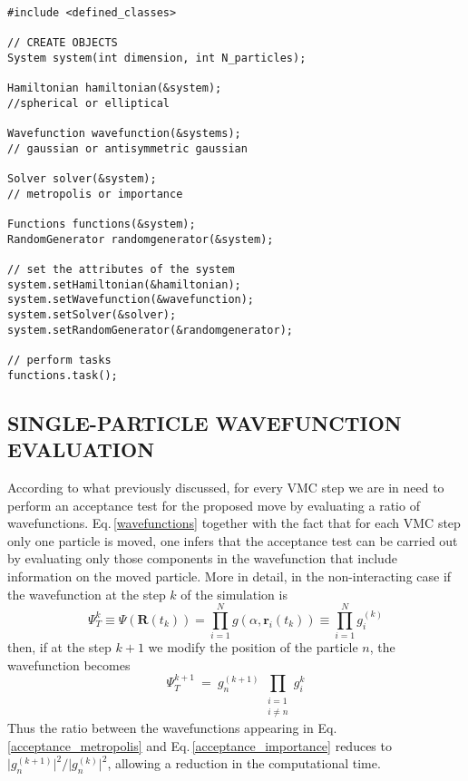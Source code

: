 \begin{verbatim}
#include <defined_classes>

// CREATE OBJECTS
System system(int dimension, int N_particles);

Hamiltonian hamiltonian(&system);
//spherical or elliptical

Wavefunction wavefunction(&systems);
// gaussian or antisymmetric gaussian

Solver solver(&system);
// metropolis or importance

Functions functions(&system);
RandomGenerator randomgenerator(&system);

// set the attributes of the system
system.setHamiltonian(&hamiltonian);
system.setWavefunction(&wavefunction);
system.setSolver(&solver);
system.setRandomGenerator(&randomgenerator);

// perform tasks
functions.task();
\end{verbatim}



\subsection{SINGLE-PARTICLE WAVEFUNCTION EVALUATION}
According to what previously discussed, for every VMC step we are in need to perform an acceptance test for the proposed move by evaluating a ratio of wavefunctions. Eq.\,\ref{wavefunctions} together with the fact that for each VMC step only one particle is moved, one infers that the acceptance test can be carried out by evaluating only those components in the wavefunction that include information on the moved particle. More in detail, in the non-interacting case if the wavefunction at the step $k$ of the simulation is
\begin{equation*}
    \Psi_T^{k} \equiv \Psi(\bm{R}(t_k)) = \prod_{i=1}^{N} g(\alpha, \bm{r}_i(t_k)) \equiv \prod_{i=1}^N g_i^{(k)}
\end{equation*}
then, if at the step $k+1$ we modify the position of the particle $n$, the wavefunction becomes
\begin{equation*}
    \Psi_T^{k+1} \ = \ g_n^{(k+1)} \, \prod_{\substack{i=1\\ i \neq n}} g_i^{k}
\end{equation*}
Thus the ratio between the wavefunctions appearing in Eq.\,\ref{acceptance_metropolis} and Eq.\,\ref{acceptance_importance} reduces to $\vert g_n^{(k+1)} \vert^2 / \vert g_n^{(k)} \vert^2$, allowing a reduction in the computational time. 


